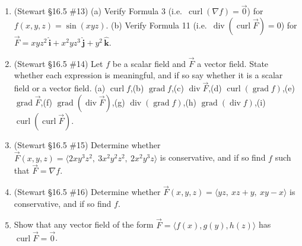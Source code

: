 \documentclass[12pt]{article}
\newcommand{\ihat}{\hat{\textbf{i}}}
\newcommand{\jhat}{\hat{\textbf{j}}}
\newcommand{\khat}{\hat{\textbf{k}}}
\begin{document}
\begin{enumerate}
\begin{enumerate}
\begin{center}
\begin{tikzpicture}[scale=0.5]
        \end{tikzpicture}\quad
        \quad
        \end{center}
        \item (Stewart \S16.5 \#13) (a) Verify Formula 3 (i.e.\ $\operatorname{curl}(\nabla f) = \vec 0$) for $f(x,y,z) = \sin(xyz)$. (b) Verify Formula 11 (i.e.\ $\operatorname{div}(\operatorname{curl}\vec F) = 0$) for $\vec F = xyz^2\,\ihat + x^2 y z^3\,\jhat + y^2\,\khat$.
        \item (Stewart \S16.5 \#14) Let $f$ be a scalar field and $\vec F$ a vector field. State whether each expression is meaningful, and if so say whether it is a scalar field or a vector field.
        (a) $\operatorname{curl} f$,\quad (b) $\operatorname{grad} f$,\quad (c) $\operatorname{div}\vec F$,\quad (d) $\operatorname{curl}(\operatorname{grad} f)$,\quad (e) $\operatorname{grad}\vec F$,\quad (f) $\operatorname{grad}(\operatorname{div}\vec F)$,\quad (g) $\operatorname{div}(\operatorname{grad} f)$,\quad (h) $\operatorname{grad}(\operatorname{div} f)$,\quad (i) $\operatorname{curl}(\operatorname{curl}\vec F)$.
        \item (Stewart \S16.5 \#15) Determine whether $\vec F(x,y,z) = \langle 2xy^3 z^2,\ 3x^2 y^2 z^2,\ 2x^2 y^3 z\rangle$ is conservative, and if so find $f$ such that $\vec F = \nabla f$.
        \item (Stewart \S16.5 \#16) Determine whether $\vec F(x,y,z) = \langle yz,\ xz + y,\ xy - x\rangle$ is conservative, and if so find $f$.
        \item Show that any vector field of the form $\vec F = \langle f(x), g(y), h(z) \rangle$ has $\operatorname{curl}\vec{F} = \vec{0}$.

\end{enumerate}
\end{enumerate}
\end{document}
